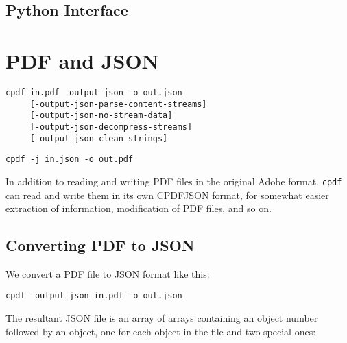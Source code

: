 \documentclass{book}
\begin{document}
\begin{pycpdflib}
\clearpage
\section*{Python Interface}
\begin{small}\tt

\end{small}
\end{pycpdflib}

\chapter{PDF and JSON}\label{chap:15}\pagestyle{fancy}
  {\small\begin{framed}
  \noindent\verb!cpdf in.pdf -output-json -o out.json!\\
  \noindent\verb!     [-output-json-parse-content-streams]!\\
  \noindent\verb!     [-output-json-no-stream-data]!\\
  \noindent\verb!     [-output-json-decompress-streams]!\\
  \noindent\verb!     [-output-json-clean-strings]!

\vspace{1.5mm}

  \noindent\verb!cpdf -j in.json -o out.pdf!
  \end{framed}}

In addition to reading and writing PDF files in the original Adobe format, \texttt{cpdf} can read and write them in its own CPDFJSON format, for somewhat easier extraction of information, modification of PDF files, and so on.

\section{Converting PDF to JSON}

We convert a PDF file to JSON format like this:

  \begin{framed}
  \small\noindent\verb!cpdf -output-json in.pdf -o out.json!
  \end{framed}

The resultant JSON file is an array of arrays containing an object number followed by an
object, one for each object in the file and two special ones:
\end{document}
